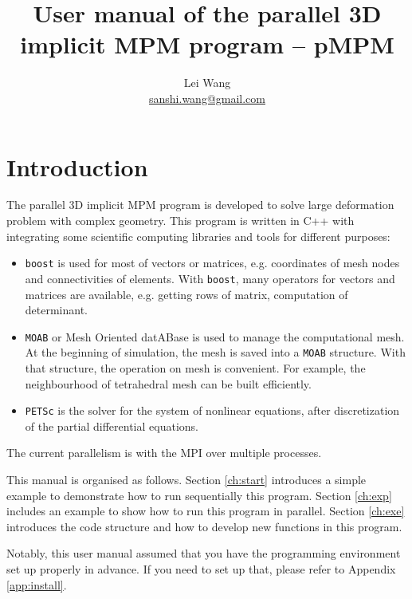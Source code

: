 \documentclass[10pt,a4paper]{article}
\author{Lei Wang \\ \href{mailto:sanshi.wang@gmail.com}{sanshi.wang@gmail.com}}
\title{User manual of the parallel 3D implicit MPM program -- pMPM}
\newcommand{\code}[1]{\texttt{#1}}
\begin{document}
\maketitle

\tableofcontents
{}






\section{Introduction}

The parallel 3D implicit MPM program is developed to solve large deformation problem with complex geometry. This program is written in C++ with integrating some scientific computing libraries and tools for different purposes:
\begin{itemize}
\item \code{boost} is used for most of vectors or matrices, e.g. coordinates of mesh nodes and connectivities of elements. With \code{boost}, many operators for vectors and matrices are available, e.g. getting rows of matrix, computation of determinant.   
\item \code{MOAB} or Mesh Oriented datABase is used to manage the computational mesh. At the beginning of simulation, the mesh is saved into a \code{MOAB} structure. With that structure, the operation on mesh is convenient. For example, the neighbourhood of tetrahedral mesh can be built efficiently. 
\item \code{PETSc} is the solver for the system of nonlinear equations, after discretization of the partial differential equations. 
\end{itemize}
The current parallelism is with the MPI over multiple processes. 

This manual is organised as follows. Section \ref{ch:start} introduces a simple example to demonstrate how to run sequentially this program. Section \ref{ch:exp} includes an example to show how to run this program in parallel. Section \ref{ch:exe} introduces the code structure and how to develop new functions in this program. 

Notably, this user manual assumed that you have the programming environment set up properly in advance. If you need to set up that, please refer to Appendix \ref{app:install}.  
\end{document}
